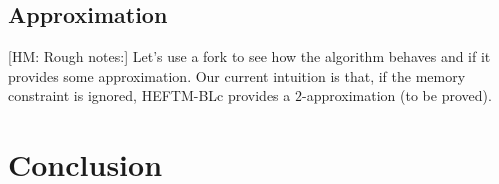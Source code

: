 \documentclass[sigconf,review,anonymous]{acmart}
\newcommand{\hmey}[1]{{\color{red}[HM: #1]}}
\begin{document}
\subsection{Approximation}
\hmey{Rough notes:}
Let's use a fork to see how the algorithm behaves and if it provides some approximation. Our current intuition is that, if the memory constraint is ignored, HEFTM-BLc provides a $2$-approximation (to be proved).



\section{Conclusion}






    
    
\end{document}
